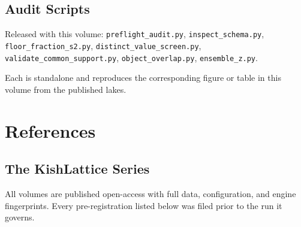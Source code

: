 \documentclass[11pt, letterpaper, openany]{book}
\begin{document}
\section{Audit Scripts}

Released with this volume: \texttt{preflight\_audit.py}, \texttt{inspect\_schema.py},
\texttt{floor\_fraction\_s2.py}, \texttt{distinct\_value\_screen.py},
\texttt{validate\_common\_support.py}, \texttt{object\_overlap.py}, \texttt{ensemble\_z.py}.

Each is standalone and reproduces the corresponding figure or table in this volume from the
published lakes.

\clearpage

\chapter*{References}

\section*{The KishLattice Series}

All volumes are published open-access with full data, configuration, and engine
fingerprints. Every pre-registration listed below was filed prior to the run it governs.
\end{document}
